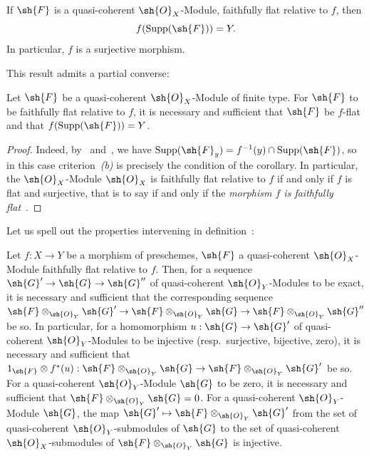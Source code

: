 \begin{corollary}[2.2.5]
\label{IV.2.2.5}
If $\sh{F}$ is a quasi-coherent $\sh{O}_X$-Module, faithfully flat relative to $f$, then
\[
  f(\operatorname{Supp}(\sh{F}))=Y.
\]
In particular, $f$ is a surjective morphism.
\end{corollary}

This result admits a partial converse:

\begin{corollary}[2.2.6]
\label{IV.2.2.6}
Let $\sh{F}$ be a quasi-coherent $\sh{O}_X$-Module of finite type. For $\sh{F}$ to be faithfully flat relative to $f$, it is necessary and sufficient that $\sh{F}$ be $f$-flat and that $f(\operatorname{Supp}(\sh{F}))=Y$.
\end{corollary}

\begin{proof}
Indeed, by~ and~, we have $\operatorname{Supp}(\sh{F}_y)=f^{-1}(y)\cap\operatorname{Supp}(\sh{F})$, so in this case criterion~\emph{(b)} is precisely the condition of the corollary.
In particular, the $\sh{O}_X$-Module $\sh{O}_X$ is faithfully flat relative to $f$ if and only if $f$ is flat and surjective, that is to say if and only if the \emph{morphism $f$ is faithfully flat}~.
\end{proof}

Let us spell out the properties intervening in definition~:

\begin{proposition}[2.2.7]
\label{IV.2.2.7}
Let $f:X\to Y$ be a morphism of preschemes, $\sh{F}$ a quasi-coherent $\sh{O}_X$-Module faithfully flat relative to $f$.
Then, for a sequence $\sh{G}'\to\sh{G}\to\sh{G}''$ of quasi-coherent $\sh{O}_Y$-Modules to be exact, it is necessary and sufficient that the corresponding sequence $\sh{F}\otimes_{\sh{O}_Y}\sh{G}'\to\sh{F}\otimes_{\sh{O}_Y}\sh{G}\to\sh{F}\otimes_{\sh{O}_Y}\sh{G}''$ be so.
In particular, for a homomorphism $u:\sh{G}\to\sh{G}'$ of quasi-coherent $\sh{O}_Y$-Modules to be injective \textnormal{(}resp.\ surjective, bijective, zero\textnormal{)}, it is necessary and sufficient that $1_{\sh{F}}\otimes f^*(u):\sh{F}\otimes_{\sh{O}_Y}\sh{G}\to\sh{F}\otimes_{\sh{O}_Y}\sh{G}'$ be so.
For a quasi-coherent $\sh{O}_Y$-Module $\sh{G}$ to be zero, it is necessary and sufficient that $\sh{F}\otimes_{\sh{O}_Y}\sh{G}=0$.
For a quasi-coherent $\sh{O}_Y$-Module $\sh{G}$, the map $\sh{G}'\mapsto\sh{F}\otimes_{\sh{O}_Y}\sh{G}'$ from the set of quasi-coherent $\sh{O}_Y$-submodules of $\sh{G}$ to the set of quasi-coherent $\sh{O}_X$-submodules of $\sh{F}\otimes_{\sh{O}_Y}\sh{G}$ is injective.
\end{proposition}

